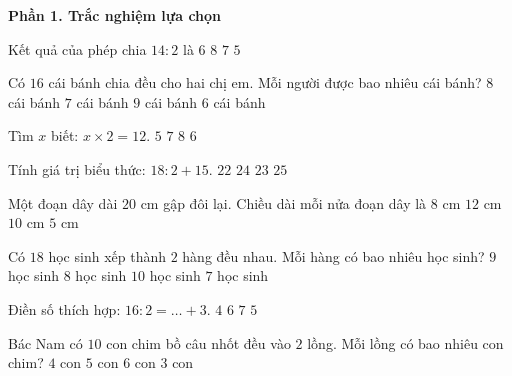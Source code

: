 \textbf{Phần 1. Trắc nghiệm lựa chọn}

\begin{ex} %
Kết quả của phép chia $14 : 2$ là
\choice
{$6$}
{$8$}
{\True $7$}
{$5$}
\end{ex}

\begin{ex} %
Có $16$ cái bánh chia đều cho hai chị em. Mỗi người được bao nhiêu cái bánh?
\choice
{\True $8$ cái bánh}
{$7$ cái bánh}
{$9$ cái bánh}
{$6$ cái bánh}
\end{ex}

\begin{ex} %
Tìm $x$ biết: $x \times 2 = 12$.
\choice
{$5$}
{$7$}
{$8$}
{\True $6$}
\end{ex}

\begin{ex} %
Tính giá trị biểu thức: $18 : 2 + 15$.
\choice
{$22$}
{\True $24$}
{$23$}
{$25$}
\end{ex}

\begin{ex} %
Một đoạn dây dài $20\text{ cm}$ gập đôi lại. Chiều dài mỗi nửa đoạn dây là
\choice
{$8\text{ cm}$}
{$12\text{ cm}$}
{\True $10\text{ cm}$}
{$5\text{ cm}$}
\end{ex}

\begin{ex} %
Có $18$ học sinh xếp thành $2$ hàng đều nhau. Mỗi hàng có bao nhiêu học sinh?
\choice
{\True $9$ học sinh}
{$8$ học sinh}
{$10$ học sinh}
{$7$ học sinh}
\end{ex}

\begin{ex} %
Điền số thích hợp: $16 : 2 = \dots + 3$.
\choice
{$4$}
{$6$}
{$7$}
{\True $5$}
\end{ex}

\begin{ex} %
Bác Nam có $10$ con chim bồ câu nhốt đều vào $2$ lồng. Mỗi lồng có bao nhiêu con chim?
\choice
{$4$ con}
{\True $5$ con}
{$6$ con}
{$3$ con}
\end{ex}

